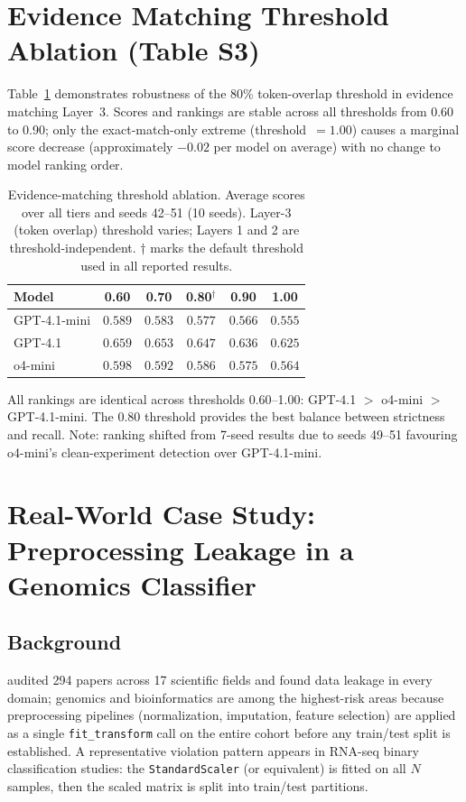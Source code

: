 \documentclass{article}
\begin{document}
\section{Evidence Matching Threshold Ablation (Table S3)}
\label{sec:threshold-ablation}

Table~\ref{tab:threshold_ablation} demonstrates robustness of the 80\% token-overlap
threshold in evidence matching Layer~3.  Scores and rankings are stable across all
thresholds from 0.60 to 0.90; only the exact-match-only extreme (threshold~$= 1.00$) causes a
marginal score decrease (approximately $-0.02$ per model on average) with no change to
model ranking order.

\begin{table}[h]
\centering
\caption{Evidence-matching threshold ablation.  Average scores over all tiers and seeds 42--51 (10 seeds).
Layer-3 (token overlap) threshold varies; Layers 1 and 2 are threshold-independent.
$\dagger$ marks the default threshold used in all reported results.}
\label{tab:threshold_ablation}
\small
\begin{tabular}{lccccc}
\toprule
\textbf{Model} & \textbf{0.60} & \textbf{0.70} & \textbf{0.80$^\dagger$} & \textbf{0.90} & \textbf{1.00} \\
\midrule
GPT-4.1-mini & $0.589$ & $0.583$ & $0.577$ & $0.566$ & $0.555$ \\
GPT-4.1      & $0.659$ & $0.653$ & $0.647$ & $0.636$ & $0.625$ \\
o4-mini      & $0.598$ & $0.592$ & $0.586$ & $0.575$ & $0.564$ \\
\bottomrule
\end{tabular}

\medskip
\small{All rankings are identical across thresholds 0.60--1.00:
GPT-4.1 $>$ o4-mini $>$ GPT-4.1-mini.  The 0.80 threshold
provides the best balance between strictness and recall.
Note: ranking shifted from 7-seed results due to seeds 49--51 favouring o4-mini's
clean-experiment detection over GPT-4.1-mini.}
\end{table}

\section{Real-World Case Study: Preprocessing Leakage in a Genomics Classifier}
\label{sec:case-study}

\subsection*{Background}
\citet{kapoor2023leakage} audited 294 papers across 17 scientific fields and found
data leakage in every domain; genomics and bioinformatics are among the highest-risk areas
because preprocessing pipelines (normalization, imputation, feature selection) are applied
as a single \texttt{fit\_transform} call on the entire cohort before any train/test split
is established.  A representative violation pattern appears in RNA-seq binary classification
studies: the \texttt{StandardScaler} (or equivalent) is fitted on all $N$ samples, then
the scaled matrix is split into train/test partitions.
\end{document}
